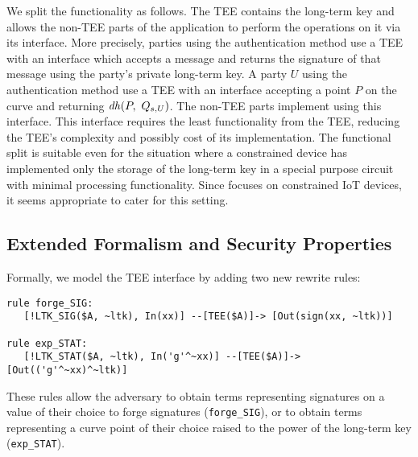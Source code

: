 \documentclass[runningheads]{llncs}
\begin{document}
We split the \mEdhoc{} functionality as follows.
%
The TEE contains the long-term key and allows the non-TEE parts of the
application to perform the operations on it via its interface.
%
More precisely, parties using the \mSig{} authentication method use a TEE with
an interface which accepts a message and returns the signature of that message
using the party's private long-term key.
%
A party $U$ using the \mStat{} authentication method use a TEE with an interface
accepting a point $P$ on the curve and returning $\mDH(P,\ \mGu{})$.
%
%
The non-TEE parts implement \mEdhoc{} using this interface.
%
This interface requires the least functionality from the TEE, reducing the TEE's
complexity and possibly cost of its implementation.
%
The functional split is suitable even for the situation where a
constrained device has implemented only the storage of the long-term key in a
special purpose circuit with minimal processing functionality.
%
Since \mEdhoc{} focuses on constrained IoT devices, it seems appropriate to
cater for this setting.
%

\subsection{Extended Formalism and Security Properties}
\label{sec:TEE:fmAndProps}
Formally, we model the TEE interface by adding two new rewrite rules:
%
\begin{small}
\begin{verbatim}
rule forge_SIG:
   [!LTK_SIG($A, ~ltk), In(xx)] --[TEE($A)]-> [Out(sign(xx, ~ltk))]

rule exp_STAT:
   [!LTK_STAT($A, ~ltk), In('g'^~xx)] --[TEE($A)]-> [Out(('g'^~xx)^~ltk)]
\end{verbatim}
\end{small}
%
These rules allow the adversary to obtain terms representing signatures on a
value of their choice to forge signatures (\verb|forge_SIG|), or to obtain terms
representing a curve point of their choice raised to the power of the
long-term key (\verb|exp_STAT|).
%
\end{document}
